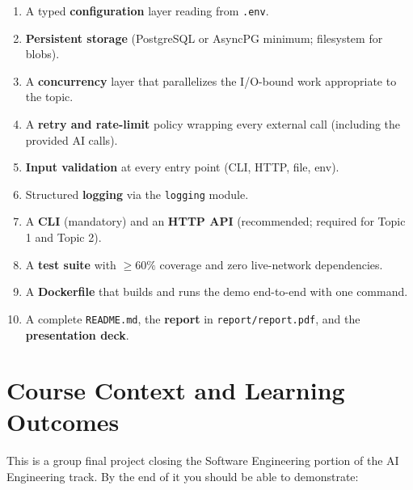 \documentclass[11pt,a4paper]{article}
\begin{document}
\begin{enumerate}[topsep=2pt,itemsep=2pt,leftmargin=2.2em]
  \item A typed \textbf{configuration} layer reading from \texttt{.env}.
  \item \textbf{Persistent storage} (PostgreSQL or AsyncPG minimum; filesystem for blobs).
  \item A \textbf{concurrency} layer that parallelizes the I/O-bound work appropriate to the topic.
  \item A \textbf{retry and rate-limit} policy wrapping every external call (including the provided AI calls).
  \item \textbf{Input validation} at every entry point (CLI, HTTP, file, env).
  \item Structured \textbf{logging} via the \texttt{logging} module.
  \item A \textbf{CLI} (mandatory) and an \textbf{HTTP API} (recommended; required for Topic 1 and Topic 2).
  \item A \textbf{test suite} with $\ge 60\%$ coverage and zero live-network dependencies.
  \item A \textbf{Dockerfile} that builds and runs the demo end-to-end with one command.
  \item A complete \texttt{README.md}, the \textbf{report} in \texttt{report/report.pdf}, and the \textbf{presentation deck}.
\end{enumerate}

\section{Course Context and Learning Outcomes}
This is a group final project closing the Software Engineering portion of the AI Engineering track. By the end of it you should be able to demonstrate:
\end{document}
